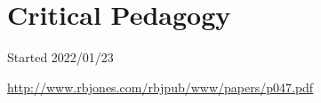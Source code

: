 \documentclass[10pt,titlepage]{article}
\begin{document}
\cite{pluckrose-cynical,lindsay-racemarx,friere-poled,gottesman-criturn}

\appendix

\section{Critical Pedagogy}


\cite{friere-poled,gottesman-criturn}


{}





\tiny{
Started 2022/01/23


\href{http://www.rbjones.com/rbjpub/www/papers/p047.pdf}{http://www.rbjones.com/rbjpub/www/papers/p047.pdf}

}%
\end{document}
